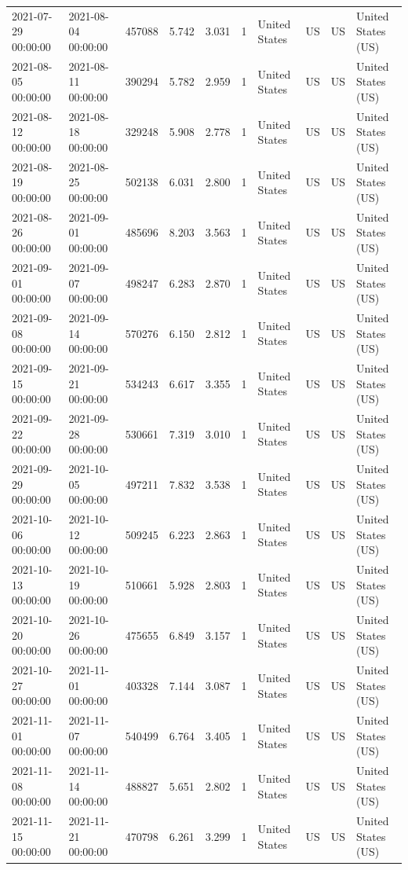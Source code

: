 \begin{tabular}{llrrrlllll}
2021-07-29 00:00:00 & 2021-08-04 00:00:00 & 457088 & 5.742 & 3.031 & 1 & United States & US & US & United States (US) \\
2021-08-05 00:00:00 & 2021-08-11 00:00:00 & 390294 & 5.782 & 2.959 & 1 & United States & US & US & United States (US) \\
2021-08-12 00:00:00 & 2021-08-18 00:00:00 & 329248 & 5.908 & 2.778 & 1 & United States & US & US & United States (US) \\
2021-08-19 00:00:00 & 2021-08-25 00:00:00 & 502138 & 6.031 & 2.800 & 1 & United States & US & US & United States (US) \\
2021-08-26 00:00:00 & 2021-09-01 00:00:00 & 485696 & 8.203 & 3.563 & 1 & United States & US & US & United States (US) \\
2021-09-01 00:00:00 & 2021-09-07 00:00:00 & 498247 & 6.283 & 2.870 & 1 & United States & US & US & United States (US) \\
2021-09-08 00:00:00 & 2021-09-14 00:00:00 & 570276 & 6.150 & 2.812 & 1 & United States & US & US & United States (US) \\
2021-09-15 00:00:00 & 2021-09-21 00:00:00 & 534243 & 6.617 & 3.355 & 1 & United States & US & US & United States (US) \\
2021-09-22 00:00:00 & 2021-09-28 00:00:00 & 530661 & 7.319 & 3.010 & 1 & United States & US & US & United States (US) \\
2021-09-29 00:00:00 & 2021-10-05 00:00:00 & 497211 & 7.832 & 3.538 & 1 & United States & US & US & United States (US) \\
2021-10-06 00:00:00 & 2021-10-12 00:00:00 & 509245 & 6.223 & 2.863 & 1 & United States & US & US & United States (US) \\
2021-10-13 00:00:00 & 2021-10-19 00:00:00 & 510661 & 5.928 & 2.803 & 1 & United States & US & US & United States (US) \\
2021-10-20 00:00:00 & 2021-10-26 00:00:00 & 475655 & 6.849 & 3.157 & 1 & United States & US & US & United States (US) \\
2021-10-27 00:00:00 & 2021-11-01 00:00:00 & 403328 & 7.144 & 3.087 & 1 & United States & US & US & United States (US) \\
2021-11-01 00:00:00 & 2021-11-07 00:00:00 & 540499 & 6.764 & 3.405 & 1 & United States & US & US & United States (US) \\
2021-11-08 00:00:00 & 2021-11-14 00:00:00 & 488827 & 5.651 & 2.802 & 1 & United States & US & US & United States (US) \\
2021-11-15 00:00:00 & 2021-11-21 00:00:00 & 470798 & 6.261 & 3.299 & 1 & United States & US & US & United States (US) \\

\end{tabular}
